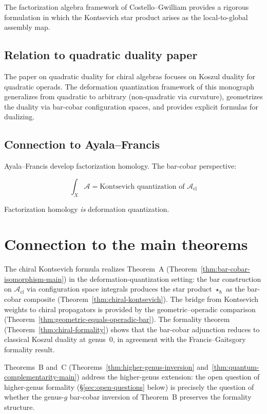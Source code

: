 The factorization algebra framework of Costello--Gwilliam provides a rigorous formulation in which the Kontsevich star product arises as the local-to-global assembly map.

\subsection{Relation to quadratic duality paper}

The paper on quadratic duality for chiral algebras \cite{QuadDual} focuses on Koszul duality for quadratic operads. The deformation quantization framework of this monograph generalizes from quadratic to arbitrary (non-quadratic via curvature), geometrizes the duality via bar-cobar configuration spaces, and provides explicit formulas for dualizing.

\subsection{Connection to Ayala--Francis}

Ayala--Francis \cite{AF15} develop factorization homology. The bar-cobar perspective:

\[\int_X \mathcal{A} = \text{Kontsevich quantization of } \mathcal{A}_{\text{cl}}\]

Factorization homology \emph{is} deformation quantization.

\section{Connection to the main theorems}

\begin{remark}
\label{rem:deformation-three-theorems}
The chiral Kontsevich formula realizes Theorem~A
(Theorem~\ref{thm:bar-cobar-isomorphism-main})
in the deformation-quantization setting:
the bar construction on $\mathcal{A}_{\mathrm{cl}}$ via configuration
space integrals produces the star product $\star_\hbar$ as the
bar-cobar composite (Theorem~\ref{thm:chiral-kontsevich}).
The bridge from Kontsevich weights to chiral propagators is
provided by the geometric--operadic comparison
(Theorem~\ref{thm:geometric-equals-operadic-bar}).
The formality theorem (Theorem~\ref{thm:chiral-formality}) shows
that the bar-cobar adjunction reduces to classical Koszul duality
at genus~0, in agreement with the Francis--Gaitsgory formality
result.

Theorems~B and~C (Theorems~\ref{thm:higher-genus-inversion}
and~\ref{thm:quantum-complementarity-main}) address the
higher-genus extension: the open question of higher-genus formality
(\S\ref{sec:open-questions} below) is precisely the question of
whether the genus-$g$ bar-cobar inversion of Theorem~B
preserves the formality structure.
\end{remark}


